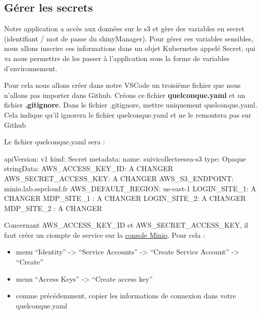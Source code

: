 \documentclass[
  letterpaper,
  DIV=11,
  numbers=noendperiod]{scrreprt}
\newenvironment{Shaded}{\begin{snugshade}}{\end{snugshade}}
\newcommand{\BuiltInTok}[1]{\textcolor[rgb]{0.00,0.23,0.31}{#1}}
\newcommand{\DecValTok}[1]{\textcolor[rgb]{0.68,0.00,0.00}{#1}}
\newcommand{\NormalTok}[1]{\textcolor[rgb]{0.00,0.23,0.31}{#1}}
\newcommand{\OperatorTok}[1]{\textcolor[rgb]{0.37,0.37,0.37}{#1}}
\providecommand{\tightlist}{%
  \setlength{\itemsep}{0pt}\setlength{\parskip}{0pt}}\usepackage{longtable,booktabs,array}
\begin{document}
\hypertarget{guxe9rer-les-secrets}{%
\subsection{Gérer les secrets}\label{guxe9rer-les-secrets}}

Notre application a accès aux données sur le s3 et gère des variables en
secret (identifiant / mot de passe du shinyManager). Pour gérer ces
variables sensibles, nous allons inscrire ces informations dans un objet
Kubernetes appelé Secret, qui va nous permettre de les passer à
l'application sous la forme de variables d'environnement.

Pour cela nous allons créer dans notre VSCode un troisième fichier que
nous n'allons pas importer dans Github. Créons ce fichier
\textbf{quelconque.yaml} et un fichier \textbf{.gitignore}. Dans le
fichier .gitignore, mettre uniquement quelconque.yaml. Cela indique
qu'il ignorera le fichier quelconque.yaml et ne le remontera pas sur
Github

Le fichier quelconque.yaml sera :

\begin{Shaded}
\begin{Highlighting}[]
\NormalTok{apiVersion: v1}
\NormalTok{kind: Secret}
\NormalTok{metadata:}
\NormalTok{  name: suivicollecteesea}\OperatorTok{{-}}\NormalTok{s3}
\BuiltInTok{type}\NormalTok{: Opaque}
\NormalTok{stringData:}
\NormalTok{  AWS\_ACCESS\_KEY\_ID: A CHANGER}
\NormalTok{  AWS\_SECRET\_ACCESS\_KEY: A CHANGER}
\NormalTok{  AWS\_S3\_ENDPOINT: minio.lab.sspcloud.fr}
\NormalTok{  AWS\_DEFAULT\_REGION: us}\OperatorTok{{-}}\NormalTok{east}\OperatorTok{{-}}\DecValTok{1}
\NormalTok{  LOGIN\_SITE\_1: A CHANGER}
\NormalTok{  MDP\_SITE\_1 : A CHANGER}
\NormalTok{  LOGIN\_SITE\_2: A CHANGER}
\NormalTok{  MDP\_SITE\_2 : A CHANGER}
\end{Highlighting}
\end{Shaded}

Concernant AWS\_ACCESS\_KEY\_ID et AWS\_SECRET\_ACCESS\_KEY, il faut
créer un ciompte de service sur la
\href{https://minio-console.lab.sspcloud.fr/login}{console Minio}. Pour
cela :

\begin{itemize}
\tightlist
\item
  menu ``Identity'' -\textgreater{} ``Service Accounts'' -\textgreater{}
  ``Create Service Account'' -\textgreater{} ``Create''\\
\item
  menu ``Access Keys'' -\textgreater{} ``Create access key''
\item
  comme précédemment, copier les informations de connexion dans votre
  quelconque.yaml
\end{itemize}
\end{document}
